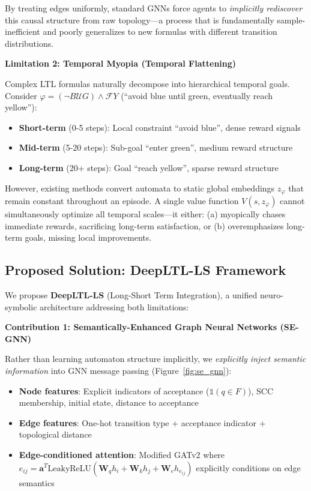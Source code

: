 \documentclass[conference]{IEEEtran}
\begin{document}
By treating edges uniformly, standard GNNs force agents to \emph{implicitly rediscover} this causal structure from raw topology---a process that is fundamentally sample-inefficient and poorly generalizes to new formulas with different transition distributions.

\textbf{Limitation 2: Temporal Myopia (Temporal Flattening)}

Complex LTL formulas naturally decompose into hierarchical temporal goals. Consider $\varphi = (\neg B \mathcal{U} G) \land \mathcal{F} Y$ (``avoid blue until green, eventually reach yellow''):
\begin{itemize}
    \item \textbf{Short-term} (0-5 steps): Local constraint ``avoid blue'', dense reward signals
    \item \textbf{Mid-term} (5-20 steps): Sub-goal ``enter green'', medium reward structure
    \item \textbf{Long-term} (20+ steps): Goal ``reach yellow'', sparse reward structure
\end{itemize}

However, existing methods convert automata to static global embeddings $z_\varphi$ that remain constant throughout an episode. A single value function $V(s, z_\varphi)$ cannot simultaneously optimize all temporal scales---it either: (a) myopically chases immediate rewards, sacrificing long-term satisfaction, or (b) overemphasizes long-term goals, missing local improvements.

\subsection{Proposed Solution: DeepLTL-LS Framework}

We propose \textbf{DeepLTL-LS} (Long-Short Term Integration), a unified neuro-symbolic architecture addressing both limitations:

\textbf{Contribution 1: Semantically-Enhanced Graph Neural Networks (SE-GNN)}

Rather than learning automaton structure implicitly, we \emph{explicitly inject semantic information} into GNN message passing (Figure~\ref{fig:se_gnn}):
\begin{itemize}
    \item \textbf{Node features}: Explicit indicators of acceptance ($\mathbb{1}(q \in F)$), SCC membership, initial state, distance to acceptance
    \item \textbf{Edge features}: One-hot transition type + acceptance indicator + topological distance  
    \item \textbf{Edge-conditioned attention}: Modified GATv2 where $e_{ij} = \mathbf{a}^T \text{LeakyReLU}(\mathbf{W}_q h_i + \mathbf{W}_k h_j + \mathbf{W}_e h_{e_{ij}})$ explicitly conditions on edge semantics
\end{itemize}
\end{document}
